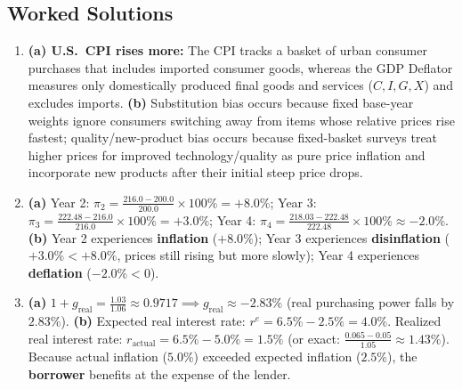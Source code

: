 \documentclass[11pt,letterpaper]{article}
\begin{document}
\subsection*{Worked Solutions}
\begin{enumerate}
    \item \textbf{(a) U.S.\ CPI rises more:} The CPI tracks a basket of urban consumer purchases that includes imported consumer goods, whereas the GDP Deflator measures only domestically produced final goods and services ($C, I, G, X$) and excludes imports. \textbf{(b)} Substitution bias occurs because fixed base-year weights ignore consumers switching away from items whose relative prices rise fastest; quality/new-product bias occurs because fixed-basket surveys treat higher prices for improved technology/quality as pure price inflation and incorporate new products after their initial steep price drops.
    \item \textbf{(a)} Year 2: $\pi_2 = \frac{216.0 - 200.0}{200.0} \times 100\% = +8.0\%$; Year 3: $\pi_3 = \frac{222.48 - 216.0}{216.0} \times 100\% = +3.0\%$; Year 4: $\pi_4 = \frac{218.03 - 222.48}{222.48} \times 100\% \approx -2.0\%$. \textbf{(b)} Year 2 experiences \textbf{inflation} ($+8.0\%$); Year 3 experiences \textbf{disinflation} ($+3.0\% < +8.0\%$, prices still rising but more slowly); Year 4 experiences \textbf{deflation} ($-2.0\% < 0$).
    \item \textbf{(a)} $1 + g_{\text{real}} = \frac{1.03}{1.06} \approx 0.9717 \implies g_{\text{real}} \approx -2.83\%$ (real purchasing power falls by $2.83\%$). \textbf{(b)} Expected real interest rate: $r^e = 6.5\% - 2.5\% = 4.0\%$. Realized real interest rate: $r_{\text{actual}} = 6.5\% - 5.0\% = 1.5\%$ (or exact: $\frac{0.065 - 0.05}{1.05} \approx 1.43\%$). Because actual inflation ($5.0\%$) exceeded expected inflation ($2.5\%$), the \textbf{borrower} benefits at the expense of the lender.
\end{enumerate}
\end{document}

